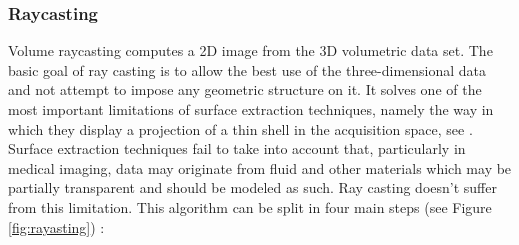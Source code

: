 \subsubsection{Raycasting}
Volume raycasting computes a 2D image from the 3D volumetric data set. The basic goal of ray casting is to allow the best use of the three-dimensional data and not attempt to impose any geometric structure on it. It solves one of the most important limitations of surface extraction techniques, namely the way in which they display a projection of a thin shell in the acquisition space, see \cite{Stegmaier:2005:SFV:2386472.2386498}. Surface extraction techniques fail to take into account that, particularly in medical imaging, data may originate from fluid and other materials which may be partially transparent and should be modeled as such. Ray casting doesn't suffer from this limitation. This algorithm can be split in four main steps (see Figure \ref{fig:rayasting}) :
